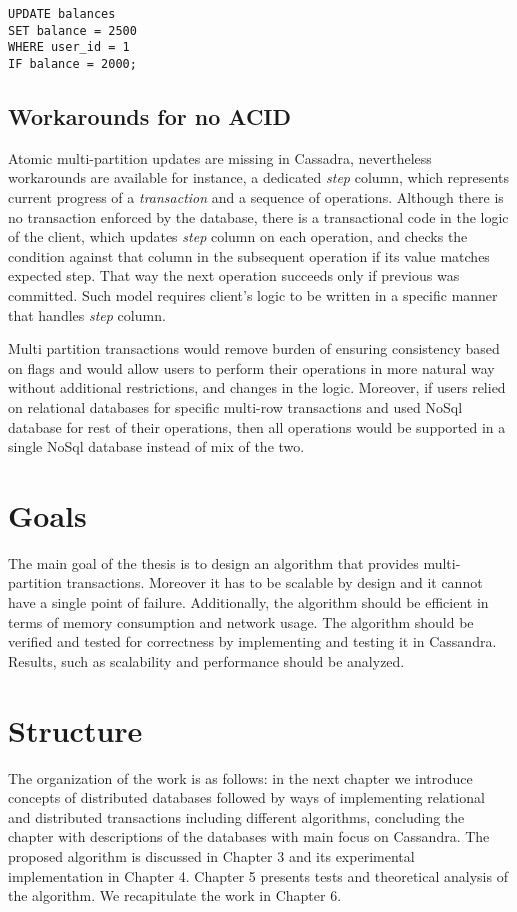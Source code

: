 \begin{example}
\label{lst:intro:lwtUpdate}
\begin{lstlisting}[style=outcode,caption={LWT Update with column condition}]
UPDATE balances 
SET balance = 2500 
WHERE user_id = 1
IF balance = 2000;
\end{lstlisting}
\end{example}


\subsection{Workarounds for no ACID}
Atomic multi-partition updates are missing in Cassadra, nevertheless workarounds are available for instance, a dedicated \emph{step} column, which represents current progress of a \emph{transaction} and a sequence of \lwt operations. Although there is no transaction enforced by the database, there is a transactional code in the logic of the client, which updates \emph{step} column on each operation, and checks the condition against that column in the subsequent operation if its value matches expected step. That way the next operation succeeds only if previous was committed. 
Such model requires client's logic to be written in a specific manner that handles \emph{step} column. 

Multi partition transactions would remove burden of ensuring consistency based on flags and would allow users to perform their operations in more natural way without additional restrictions, and changes in the logic. Moreover, if users relied on relational databases for specific multi-row transactions and used NoSql database for rest of their operations, then all operations would be supported in a single NoSql database instead of mix of the two.

\section{Goals}
The main goal of the thesis is to design an algorithm that provides multi-partition transactions. Moreover it has to be scalable by design and it cannot have a single point of failure. Additionally, the algorithm should be efficient in terms of memory consumption and network usage. The algorithm should be verified and tested for correctness by implementing and testing it in Cassandra. Results, such as scalability and performance should be analyzed.

 
\section{Structure}\label{sec:introduction:structure}
The organization of the work is as follows: 
in the next chapter we introduce concepts of distributed databases followed by ways of implementing relational and distributed transactions including different algorithms, concluding the chapter with descriptions of the databases with main focus on Cassandra. 
The proposed algorithm is discussed in Chapter 3 and its experimental implementation in Chapter 4.
Chapter 5 presents tests and theoretical analysis of the algorithm.
We recapitulate the work in Chapter 6.

